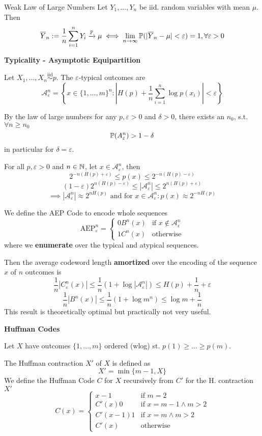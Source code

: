 \begin{mainbox}
    {Weak Law of Large Numbers}
    Let \(Y_1, ..., Y_n\) be iid. random variables with mean \(\mu\). Then 
    \[\overline{Y}_n := \frac{1}{n}\sum_{i = 1}^n Y_i \xrightarrow[]{\P} \mu \iff \lim_{n \to \infty}\P(|\overline{Y}_n - \mu| < \varepsilon) = 1, \forall \varepsilon > 0\]
\end{mainbox}

\textbf{Typicality - Asymptotic Equipartition}

Let \(X_1, ..., X_n \overset{\text{iid}}{\sim} p\). The \(\varepsilon\)-typical outcomes are 
\[\mathcal{A}_\varepsilon^n = \left\{x \in \{1, ..., m\}^n:\left|H(p)+ \frac{1}{n}\sum_{i = 1}^n \log p(x_i)\right| < \varepsilon\right\}\]

By the law of large numbers for any \(p, \varepsilon > 0\) and \(\delta > 0\), there exists an \(n_0\), s.t. \(\forall n \geq n_0\)
\[\P(A_\varepsilon^n)>1- \delta\]
in particular for \(\delta = \varepsilon\).

For all \(p, \varepsilon>0\) and \(n \in \N\), let \(x \in \mathcal{A}_\varepsilon^n\), then
\[2^{-n(H(p)+\varepsilon)} \leq p(x) \leq 2^{-n(H(p)-\varepsilon)}\]
\[(1-\varepsilon)2^{n(H(p)-\varepsilon)}\leq|\mathcal{A}_\varepsilon^n| \leq 2^{n(H(p)+\varepsilon)}\]
\[\implies |\mathcal{A}_\varepsilon^n| \approx 2^{nH(p)} \text{ and for }x \in \mathcal{A}_\varepsilon^n: p(x) \approx 2^{-nH(p)} \]

We define the AEP Code to encode whole sequences
\[\text{AEP}_\varepsilon^n = \begin{cases}
    0 B^n(x) &\text{if }x \notin \mathcal{A}_\varepsilon^n\\
    1 C^n(x) &\text{otherwise}
\end{cases}\]
where we \textbf{enumerate} over the typical and atypical sequences.

Then the average codeword length \textbf{amortized} over the encoding of the sequence \(x\) of \(n\) outcomes is
\[\frac{1}{n}|C_\varepsilon^n(x)| \leq \frac{1}{n}(1+\log|\mathcal{A}_\varepsilon^n|) \leq H(p)+ \frac{1}{n} + \varepsilon\]
\[\frac{1}{n}|B^n(x)| \leq \frac{1}{n}(1 + \log m^n) \leq \log m + \frac{1}{n}\]
This result is theoretically optimal but practically not very useful.

\vspace*{1mm}
\textbf{Huffman Codes}

Let \(X\) have outcomes \(\{1, ..., m\}\) ordered (wlog) st. \(p(1) \geq ... \geq p(m)\). 

The Huffman contraction \(X'\) of \(X\) is defined as 
\[X' = \min\{m-1, X\}\]
We define the Huffman Code \(C\) for \(X\) recursively from \(C'\) for the H. contraction \(X'\)
\[C(x) = \begin{cases}
    x-1 &\text{if }m = 2\\
    C'(x)0 &\text{if }x = m-1 \land m > 2\\
    C'(x-1)1 &\text{if } x = m \land m > 2\\
    C'(x) &\text{otherwise} 
\end{cases}\]

